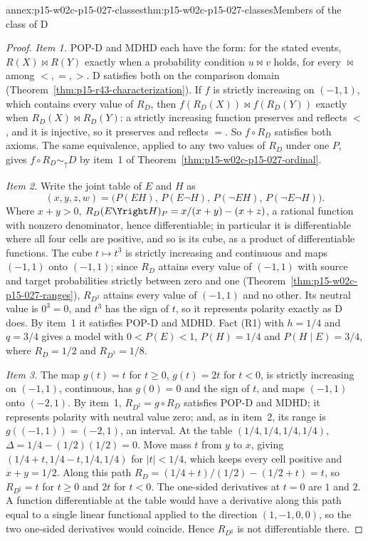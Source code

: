 \begin{annexitem}{annex:p15-w02c-p15-027-classes}{thm:p15-w02c-p15-027-classes}{Members of the class of D}
\begin{proof}
\emph{Item 1.} POP-D and MDHD each have the form: for the stated
events, \(R(X)\bowtie R(Y)\) exactly when a probability condition
\(u\bowtie v\) holds, for every \(\bowtie\) among \(<,=,>\). D satisfies
both on the comparison domain (Theorem~\ref{thm:p15-r43-characterization}).
If \(f\) is strictly increasing on \((-1,1)\), which contains every value
of \(R_D\), then \(f(R_D(X))\bowtie f(R_D(Y))\) exactly when
\(R_D(X)\bowtie R_D(Y)\): a strictly increasing function preserves and
reflects \(<\), and it is injective, so it preserves and reflects \(=\).
So \(f\circ R_D\) satisfies both axioms. The same equivalence, applied to
any two values of \(R_D\) under one \(P\), gives
\(f\circ R_D\sim_{\uparrow}D\) by item~1 of
Theorem~\ref{thm:p15-w02c-p15-027-ordinal}.

\emph{Item 2.} Write the joint table of \(E\) and \(H\) as
\[
 (x,y,z,w)=\bigl(P(EH),\,P(E\neg H),\,P(\neg EH),\,P(\neg E\neg H)\bigr).
\]
Where
\(x+y>0\),
\(R_D(E\Yright H)_P=x/(x+y)-(x+z)\), a rational function with nonzero
denominator, hence differentiable; in particular it is differentiable
where all four cells are positive, and so is its cube, as a product of
differentiable functions. The cube \(t\mapsto t^3\) is strictly
increasing and continuous and maps \((-1,1)\) onto \((-1,1)\); since
\(R_D\) attains every value of \((-1,1)\) with source and target
probabilities strictly between zero and one
(Theorem~\ref{thm:p15-w02c-p15-027-ranges}), \(R_{D^3}\) attains every
value of \((-1,1)\) and no other. Its neutral value is \(0^3=0\), and
\(t^3\) has the sign of \(t\), so it represents polarity exactly as D
does. By item~1 it satisfies POP-D and MDHD. Fact (R1) with
\(h=1/4\) and \(q=3/4\) gives a model with \(0<P(E)<1\),
\(P(H)=1/4\) and \(P(H\mid E)=3/4\), where \(R_D=1/2\) and
\(R_{D^3}=1/8\).

\emph{Item 3.} The map \(g(t)=t\) for \(t\geq0\), \(g(t)=2t\) for
\(t<0\), is strictly increasing on \((-1,1)\), continuous, has
\(g(0)=0\) and the sign of \(t\), and maps \((-1,1)\) onto \((-2,1)\).
By item~1, \(R_{D^\sharp}=g\circ R_D\) satisfies POP-D and MDHD; it
represents polarity with neutral value zero; and, as in item~2, its
range is \(g((-1,1))=(-2,1)\), an interval. At the table
\((1/4,1/4,1/4,1/4)\), \(\Delta=1/4-(1/2)(1/2)=0\). Move mass \(t\) from
\(y\) to \(x\), giving \((1/4+t,1/4-t,1/4,1/4)\) for \(|t|<1/4\), which
keeps every cell positive and \(x+y=1/2\). Along this path
\(R_D=(1/4+t)/(1/2)-(1/2+t)=t\), so \(R_{D^\sharp}=t\) for \(t\geq0\)
and \(2t\) for \(t<0\). The one-sided derivatives at \(t=0\) are \(1\)
and \(2\). A function differentiable at the table would have a
derivative along this path equal to a single linear functional applied
to the direction \((1,-1,0,0)\), so the two one-sided derivatives would
coincide. Hence \(R_{D^\sharp}\) is not differentiable there.
\end{proof}
\end{annexitem}

